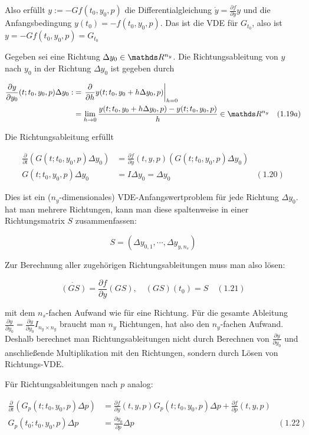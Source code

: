 Also erfüllt $y := -G f(t_0, y_0, p)$ die Differentialgleichung $\dot y = \tfrac{\partial f}{\partial y} y$ und die Anfangsbedingung $y(t_0) = -f(t_0, y_0, p)$. Das ist die VDE für $G_{t_0}$, also ist $y = -G f(t_0, y_0, p) = G_{t_0}$


Gegeben sei eine Richtung $\Delta y_0 \in \R^{n_y}$. Die Richtungsableitung von $y$ nach $y_0$ in der Richtung $\Delta y_0$ ist gegeben durch

\begin{align*}
\frac{\partial y}{\partial y_0} (t; t_0, y_0, p) \Delta y_0 :&= \l. \frac \partial{\partial h} y(t; t_0, y_0 + h \Delta y_0, p) \r|_{h=0} \\
&= \lim_{h \to 0} \frac{y(t; t_0, y_0 + h \Delta y_0, p) - y(t; t_0, y_0, p)}{h} \in \R^{n_y} & (1.19a)
\end{align*}

Die Richtungsableitung erfüllt

\begin{align*}
\frac{\partial}{\partial t}(G(t; t_0, y_0, p) \Delta y_0) &= \frac{\partial f}{\partial y} (t,y,p) (G(t;t_0,y_0,p)\Delta y_0) \\
G(t;t_0,y_0,p) \Delta y_0 &= I\Delta y_0 = \Delta y_0 & (1.20)
\end{align*}

Dies ist ein ($n_y$-dimensionales) VDE-Anfangswertproblem für jede Richtung $\Delta y_0$. hat man mehrere Richtungen, kann man diese spaltenweise in einer Richtungsmatrix $S$ zusammenfassen:

\[ S = ( \Delta y_{0,1}, \cdots, \Delta y_{y,n_s}) \]

Zur Berechnung aller zugehörigen Richtungsableitungen muss man also lösen:

\[ \dot{(GS)} = \frac{\partial f}{\partial y} (GS), \quad (GS)(t_0) = S \quad (1.21) \]

mit dem $n_s$-fachen Aufwand wie für eine Richtung. Für die gesamte Ableitung $\frac{\partial y}{\partial y_0} = \frac{\partial y}{\partial y_0} I_{n_y \times n_y}$ braucht man $n_y$ Richtungen, hat also den $n_y$-fachen Aufwand. Deshalb berechnet man Richtungsableitungen nicht durch Berechnen von $\frac{\partial y}{\partial y_0}$ und anschließende Multiplikation mit den Richtungen, sondern durch Lösen von Richtungs-VDE.

Für Richtungsableitungen nach $p$ analog:

\begin{align*}
\frac \partial{\partial t} (G_p(t;t_0,y_0,p) \Delta p) &= \frac{\partial f}{\partial y} (t,y,p) G_p(t;t_0,y_0,p) \Delta p + \frac{\partial f}{\partial p}(t,y,p) \\
G_p(t_0; t_0, y_0, p) \Delta p &= \frac{\partial y_0}{\partial p} \Delta p & (1.22) 
\end{align*}

